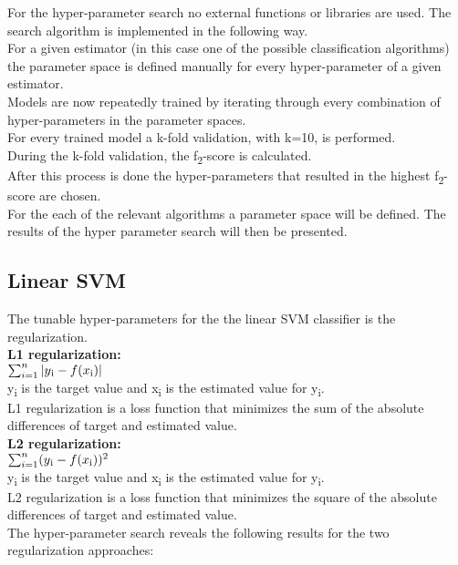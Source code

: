 For the hyper-parameter search no external functions or libraries are used. The search algorithm is implemented in the following way.\\ For a given estimator (in this case one of the possible classification algorithms) the parameter space is defined manually for every hyper-parameter of a given estimator.\\
Models are now repeatedly trained by iterating through every combination of hyper-parameters in the parameter spaces.\\
For every trained model a  k-fold validation, with k=10, is performed.\\
During the k-fold validation, the f\textsubscript{2}-score is calculated.\\
After this process is done the hyper-parameters that resulted in the highest f\textsubscript{2}-score are chosen.\\
For the each of the relevant algorithms a parameter space will be defined. The results of the hyper parameter search will then be presented.

\subsection*{Linear SVM}
The tunable hyper-parameters for the the linear SVM classifier is the regularization. \\
\textbf{L1 regularization:}\\
$\sum_{i=1}^{n}|y\textsubscript{i}-f(x\textsubscript{i})| $ \\
 y\textsubscript{i} is the target value and x\textsubscript{i} is the estimated value for y\textsubscript{i}.\\
 L1 regularization is a loss function that minimizes the sum of the absolute differences of target and estimated value.
\\
\textbf{L2 regularization:}  \\
$\sum_{i=1}^{n}(y\textsubscript{i}-f(x\textsubscript{i}))^2 $ \\
 y\textsubscript{i} is the target value and x\textsubscript{i} is the estimated value for  y\textsubscript{i}.\\
 L2 regularization is a loss function that minimizes the square of the absolute differences of target and estimated value.
\\

The hyper-parameter search reveals the following results for the two regularization approaches: \\

